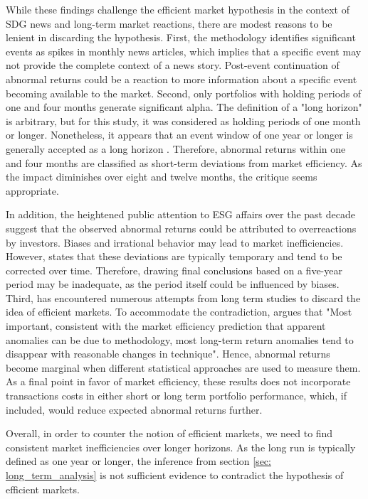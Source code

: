 While these findings challenge the efficient market hypothesis in the context of SDG news and long-term market reactions, there are modest reasons to be lenient in discarding the hypothesis. First, the methodology identifies significant events as spikes in monthly news articles, which implies that a specific event may not provide the complete context of a news story. Post-event continuation of abnormal returns could be a reaction to more information about a specific event becoming available to the market. Second, only portfolios with holding periods of one and four months generate significant alpha. The definition of a "long horizon" is arbitrary, but for this study, it was considered as holding periods of one month or longer. Nonetheless, it appears that an event window of one year or longer is generally accepted as a long horizon \cite{kothari}. Therefore, abnormal returns within one and four months are classified as short-term deviations from market efficiency. As the impact diminishes over eight and twelve months, the critique seems appropriate.

In addition, the heightened public attention to ESG affairs over the past decade suggest that the observed abnormal returns could be attributed to overreactions by investors. Biases and irrational behavior may lead to market inefficiencies. However, \citep{fama1998_events} states that these deviations are typically temporary and tend to be corrected over time. Therefore, drawing final conclusions based on a five-year period may be inadequate, as the period itself could be influenced by biases. Third, \citeauthor{fama1998_events} has encountered numerous attempts from long term studies to discard the idea of efficient markets. To accommodate the contradiction, \citeauthor{fama1998_events} argues that "Most important, consistent with the market efficiency prediction that apparent anomalies can be due to methodology, most long-term return anomalies tend to disappear with reasonable changes in technique". Hence, abnormal returns become marginal when different statistical approaches are used to measure them. As a final point in favor of market efficiency, these results does not incorporate transactions costs in either short or long term portfolio performance, which, if included, would reduce expected abnormal returns further. 

Overall, in order to counter the notion of efficient markets, we need to find consistent market inefficiencies over longer horizons. As the long run is typically defined as one year or longer, the inference from section \ref{sec: long_term_analysis} is not sufficient evidence to contradict the hypothesis of efficient markets. 


